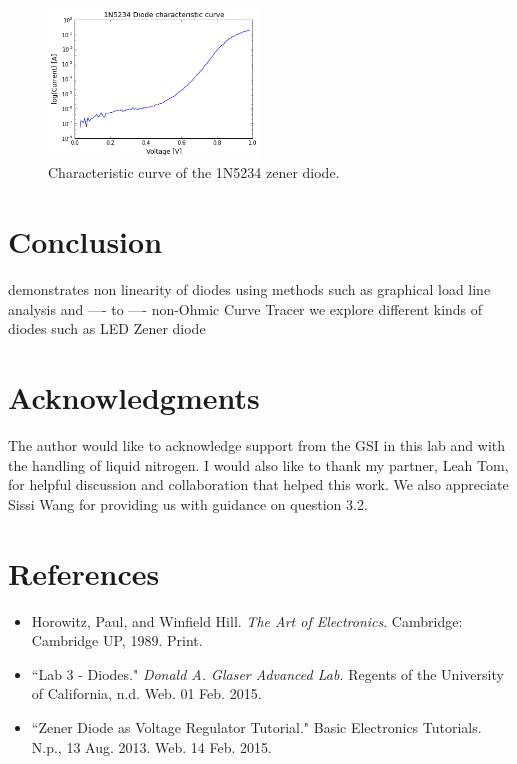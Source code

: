 \documentclass[authoryear, 12pt,5p, times]{elsarticle}
\begin{document}
\begin{figure}[h!]
\center
\includegraphics[width=0.5\textwidth]{figure/3_18_curve}
\caption{Characteristic curve of the 1N5234 zener diode. }
\label{3_18_curve}
\end{figure}
\section{Conclusion}
demonstrates non linearity of diodes
using methods such as graphical load line analysis and ---- to ---- 
non-Ohmic 
Curve Tracer
we explore different kinds of diodes such as 
LED
Zener diode
\section*{Acknowledgments}
\begin{footnotesize}
The author would like to acknowledge support from the GSI in this lab and with the handling of liquid nitrogen. I would also like to thank my partner, Leah Tom, for helpful discussion and collaboration that helped this work. We also appreciate Sissi Wang for providing us with guidance on question 3.2.
\end{footnotesize}
  \section*{References}
 \begin{footnotesize}
 \begin{itemize}
 \item Horowitz, Paul, and Winfield Hill. \textit{The Art of Electronics}. Cambridge: Cambridge UP, 1989. Print.
 
 \item ``Lab 3 - Diodes." \textit{Donald A. Glaser Advanced Lab.} Regents of the University of California, n.d. Web. 01 Feb. 2015.
  \item ``Zener Diode as Voltage Regulator Tutorial." Basic Electronics Tutorials. N.p., 13 Aug. 2013. Web. 14 Feb. 2015.
\end{itemize} 
  \end{footnotesize}
\end{document}
